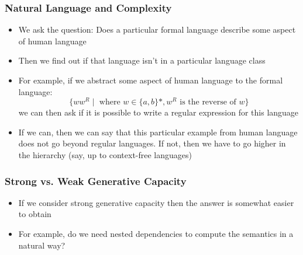 \documentclass[compress,color=usenames]{beamer}
\begin{document}


\begin{frame}
\frametitle{Natural Language and Complexity}


\begin{itemize}

\item We ask the question: Does a particular formal language describe some
aspect of human language

\item Then we find out if that language isn't in a particular language class

\item For example, if we abstract some aspect of human language to the
formal language: 
$$\{ww^R \mid \mbox{ where } w \in \{a, b\}*, w^R \mbox{ is the reverse of } w\}$$ 
we can then ask if it is possible to write a regular expression for this language

\item If we can, then we can say that this particular example from human
language does not go beyond regular languages. If not, then we have to
go higher in the hierarchy (say, up to context-free languages)
\end{itemize}

\end{frame}

\begin{frame}
\frametitle{Strong vs. Weak Generative Capacity}

\begin{itemize}
\item If we consider strong generative capacity then the answer is somewhat
easier to obtain

\item For example, do we need nested dependencies to compute the
semantics in a natural way?
\end{itemize}

\end{frame}
\end{document}
